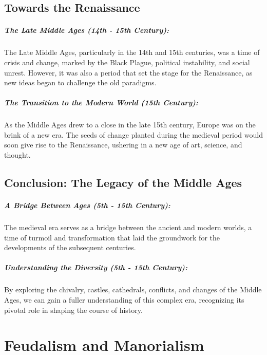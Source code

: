 \documentclass[a4paper,12pt]{book}
\begin{document}
\section*{Towards the Renaissance}

\paragraph{The Late Middle Ages (14th - 15th Century):}
The Late Middle Ages, particularly in the 14th and 15th centuries, was a time of crisis and change, marked by the Black Plague, political instability, and social unrest. However, it was also a period that set the stage for the Renaissance, as new ideas began to challenge the old paradigms.

\paragraph{The Transition to the Modern World (15th Century):}
As the Middle Ages drew to a close in the late 15th century, Europe was on the brink of a new era. The seeds of change planted during the medieval period would soon give rise to the Renaissance, ushering in a new age of art, science, and thought.

\section*{Conclusion: The Legacy of the Middle Ages}

\paragraph{A Bridge Between Ages (5th - 15th Century):}
The medieval era serves as a bridge between the ancient and modern worlds, a time of turmoil and transformation that laid the groundwork for the developments of the subsequent centuries.

\paragraph{Understanding the Diversity (5th - 15th Century):}
By exploring the chivalry, castles, cathedrals, conflicts, and changes of the Middle Ages, we can gain a fuller understanding of this complex era, recognizing its pivotal role in shaping the course of history.

\chapter{Feudalism and Manorialism}
\end{document}
